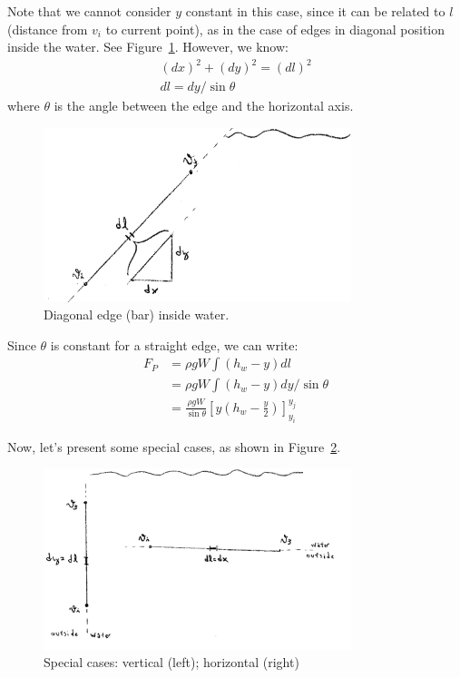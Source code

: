 \documentclass[12pt]{article}
\begin{document}
Note that we cannot consider $y$ constant in this case, since it can be related to $l$ (distance from $v_i$ to current point), as in the case of edges in diagonal position inside the water. See Figure~\ref{fig:diagonal}. However, we know:
\begin{align*}
  (dx)^2 + (dy)^2 = (dl)^2\\
  dl = dy/\sin \theta
\end{align*} 
where $\theta$ is the angle between the edge and the horizontal axis.

\begin{figure}[hbt]
  \begin{center}
    \includegraphics[width=0.8\textwidth]{diagonal.png}
  \end{center}
  \caption{Diagonal edge (bar) inside water.}
  \label{fig:diagonal}
\end{figure}

Since $\theta$ is constant for a straight edge, we can write:
\begin{align*}
  F_P &= \rho g W \int (h_w - y) dl\\
  &= \rho g W \int (h_w - y) dy/\sin{\theta}\\
  &= \frac{\rho g W}{\sin{\theta}} \left[ y \left(h_w - \frac{y}{2}\right) \right]_{y_i}^{y_j}
\end{align*}

Now, let's present some special cases, as shown in Figure~\ref{fig:horizontal-vertical}.

\begin{figure}[hbt]
  \begin{center}
    \includegraphics[width=0.8\textwidth]{horizontal-vertical.png}
  \end{center}
  \caption{Special cases: vertical (left); horizontal (right) }
  \label{fig:horizontal-vertical}
\end{figure}
\end{document}
